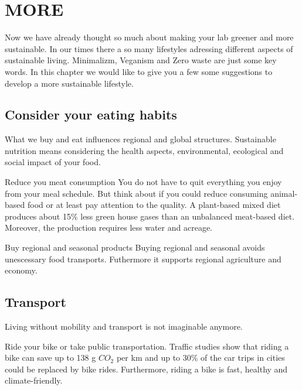 
\chapter{MORE}\label{chap:more}
Now we have already thought so much about making your lab greener and more sustainable. 
In our times there a so many lifestyles adressing different aspects of sustainable living. 
Minimalizm, Veganism and Zero waste are just some key words. 
In this chapter we would like to give you a few some suggestions to develop a more sustainable lifestyle.


\section{Consider your eating habits} 
 	What we buy and eat influences regional and global structures. 
 	Sustainable nutrition means considering the health aspects, environmental, ecological and social impact of your food. \cite{food}
 	
\begin{suggest}{Reduce you meat consumption}
 	You do not have to quit everything you enjoy from your meal schedule.
 	But think about if you could reduce consuming animal-based food or at least pay attention to the quality. 
 	A plant-based mixed diet produces about 15\% less green house gases than an unbalanced meat-based diet. Moreover, the production requires less water and acreage.
\end{suggest}
 	
\begin{suggest}{Buy regional and seasonal products}
  	Buying regional and seasonal avoids unescessary food transports. 
  	Futhermore it supports regional agriculture and economy. 
\end{suggest}

\section{Transport}
	Living without mobility and transport is not imaginable anymore. 
\begin{suggest}{Ride your bike or take public transportation.}
	Traffic studies show that riding a bike can save up to 138 g $CO_{2}$  per km and up to 30\% of the car trips in cities could be replaced by bike rides.\cite{bike}
	Furthermore, riding a bike is fast, healthy and climate-friendly. 
\end{suggest}

